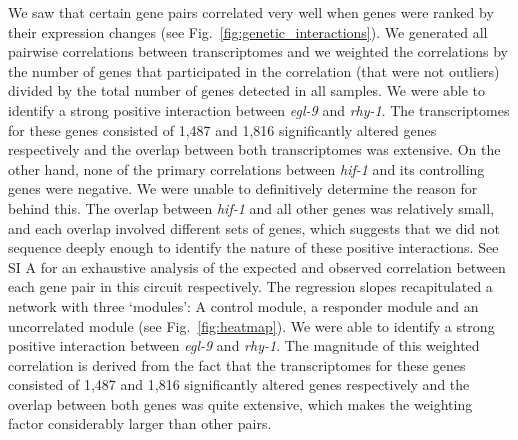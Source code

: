 \documentclass[9pt,twocolumn,twoside]{pnas-new}
\newcommand{\egl}{\emph{egl-9}}
\newcommand{\rhy}{\emph{rhy-1}}
\newcommand{\hif}{\emph{hif-1}}
\newcommand{\egln}{1,487}
\newcommand{\rhyn}{1,816}
\begin{document}
We saw that certain gene pairs correlated very well when genes were ranked by their expression changes (see Fig.~\ref{fig:genetic_interactions}). We generated all pairwise correlations between transcriptomes and we weighted the correlations by the number of genes that participated in the correlation (that were not outliers) divided by the total number of genes detected in all samples.
We were able to identify a strong positive interaction between \egl{} and \rhy{}. The transcriptomes for these genes consisted of \egln{} and \rhyn{} significantly altered genes respectively and the overlap between both transcriptomes was extensive. On the other hand, none of the primary correlations between \hif{} and its controlling genes were negative. We were unable to definitively determine the reason for behind this. The overlap between \hif{} and all other genes was relatively small, and each overlap involved different sets of genes, which suggests that we did not sequence deeply enough to identify the nature of these positive interactions. See SI A for an exhaustive analysis of the expected and observed correlation between each gene pair in this circuit respectively.
The regression slopes recapitulated a network with three `modules': A control module, a responder module and an uncorrelated module (see Fig.~\ref{fig:heatmap}). We were able to identify a strong positive interaction between \egl{} and \rhy{}. The magnitude of this weighted correlation is derived from the fact that the transcriptomes for these genes consisted of \egln{} and \rhyn{} significantly altered genes respectively and the overlap between both genes was quite extensive, which makes the weighting factor considerably larger than other pairs.
\end{document}
